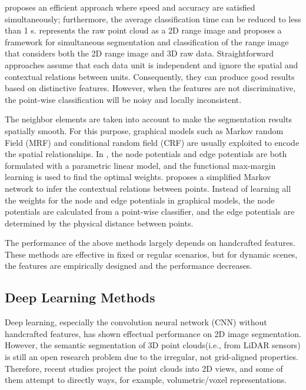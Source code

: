 \cite{hu2013efficient} proposes an efficient approach where speed and accuracy are satisfied simultaneously; furthermore, the average classification time can be reduced to less than 1 s. \cite{zhao2010scene} represents the raw point cloud as a 2D range image and proposes a framework for simultaneous segmentation and classification of the range image that considers both the 2D range image and 3D raw data. Straightforward approaches assume that each data unit is independent and ignore the spatial and contextual relations between units. Consequently, they can produce good results based on distinctive features. However, when the features are not discriminative, the point-wise classification will be noisy and locally inconsistent\cite{munoz2009onboard}.

The neighbor elements are taken into account to make the segmentation results spatially smooth. For this purpose, graphical models such as Markov random Field (MRF) and conditional random field (CRF) are usually exploited to encode the spatial relationships. In \cite{munoz2009contextual}, the node potentials and edge potentials are both formulated with a parametric linear model, and the functional max-margin learning is used to find the optimal weights. \cite{lu2012simplified} proposes a simplified Markov network to infer the contextual relations between points. Instead of learning all the weights for the node and edge potentials in graphical models, the node potentials are calculated from a point-wise classifier, and the edge potentials are determined by the physical distance between points. 

The performance of the above methods largely depends on handcrafted features. These methods are effective in fixed or regular scenarios, but for dynamic scenes, the features are empirically designed and the performance decreases.

\subsection{Deep Learning Methods}
Deep learning, especially the convolution neural network (CNN) without handcrafted features, has shown effectual performance on 2D image segmentation\cite{garcia2017review}. However, the semantic segmentation of 3D point clouds(i.e., from LiDAR sensors) is still an open research problem\cite{engelmann2017exploring} due to the irregular, not grid-aligned properties. Therefore, recent studies project the point clouds into 2D views, and some of them attempt to directly ways, for example, volumetric/voxel representations.

